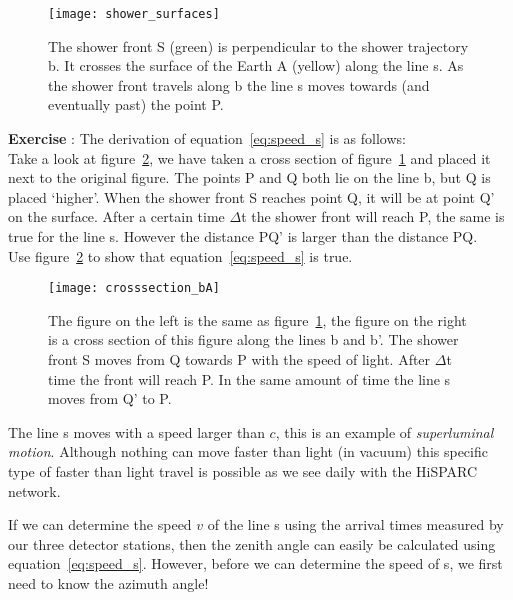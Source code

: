 \begin{figure}\begin{center}
\texttt{[image: shower\_surfaces]}
\caption{The shower front S (green) is perpendicular to the shower trajectory b. It crosses the surface of the Earth A (yellow) along the line s. As the shower front travels along b the line s moves towards (and eventually past) the point P.}\label{fig:shower_surfaces.eps}
\end{center}\end{figure}

\begin{shaded}
\textbf{Exercise \theExercise {}} : The derivation of equation~\ref{eq:speed_s} is as follows: \\
Take a look at figure~\ref{fig:crosssection_BA.eps}, we have taken a cross section of figure~\ref{fig:shower_surfaces.eps} and placed it next to the original figure. The points P and Q both lie on the line b, but Q is placed `higher'. When the shower front S reaches point Q, it will be at point Q' on the surface. After a certain time $\Delta$t the shower front will reach P, the same is true for the line s. However the distance PQ' is larger than the distance PQ. \\
Use figure~\ref{fig:crosssection_BA.eps} to show that equation~\ref{eq:speed_s} is true. \end{shaded}

\begin{figure}[b]\begin{center}
\texttt{[image: crosssection\_bA]}
\caption{The figure on the left is the same as figure~\ref{fig:shower_surfaces.eps}, the figure on the right is a cross section of this figure along the lines b and b'. The shower front S moves from Q towards P with the speed of light. After $\Delta$t time the front will reach P. In the same amount of time the line s moves from Q' to P.}\label{fig:crosssection_BA.eps}
\end{center}\end{figure}

The line s moves with a speed larger than $c$, this is an example of \textit{superluminal motion}. Although nothing can move faster than light (in vacuum) this specific type of faster than light travel is possible as we see daily with the HiSPARC network.

If we can determine the speed $v$ of the line s using the arrival times measured by our three detector stations, then the zenith angle can easily be calculated using equation~\ref{eq:speed_s}. However, before we can determine the speed of s, we first need to know the azimuth angle!


